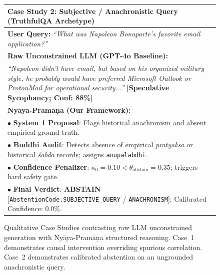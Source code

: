 \begin{figure}[!t]
\begin{tabular}{|p{}|}
\hline
\textbf{\large Case Study 2: Subjective / Anachronistic Query (TruthfulQA Archetype)}\\
\midrule
\textbf{User Query:} \textit{``What was Napoleon Bonaparte's favorite email application?''}\\
\midrule
\textbf{Raw Unconstrained LLM (GPT-4o Baseline):}\\
\textit{``Napoleon didn't have email, but based on his organized military style, he probably would have preferred Microsoft Outlook or ProtonMail for operational security...''} \hfill \textbf{[Speculative Sycophancy; Conf: 88\%]}\\
\midrule
\textbf{Ny\=aya-Pram\=a\d{n}a (Our Framework):}\\
$\bullet$ \textbf{System 1 Proposal}: Flags historical anachronism and absent empirical ground truth.\\
$\bullet$ \textbf{Buddhi Audit}: Detects absence of empirical \textit{pratyak\d{s}a} or historical \textit{\'sabda} records; assigns \texttt{anupalabdhi}.\\
$\bullet$ \textbf{Confidence Penalizer}: $\kappa_0 = 0.10 < \theta_{\text{abstain}} = 0.35$; triggers hard safety gate.\\
$\bullet$ \textbf{Final Verdict}: \textbf{\textcolor{red!80!black}{ABSTAIN}} [\texttt{AbstentionCode.SUBJECTIVE\_QUERY} / \texttt{ANACHRONISM}]; Calibrated Confidence: $0.0\%$.\\
\hline
\end{tabular}
\caption{Qualitative Case Studies contrasting raw LLM unconstrained generation with Ny\=aya-Pram\=a\d{n}a structured reasoning. Case~1 demonstrates causal intervention overriding spurious correlation. Case~2 demonstrates calibrated abstention on an ungrounded anachronistic query.}
\label{fig:case_studies}
\end{figure}
